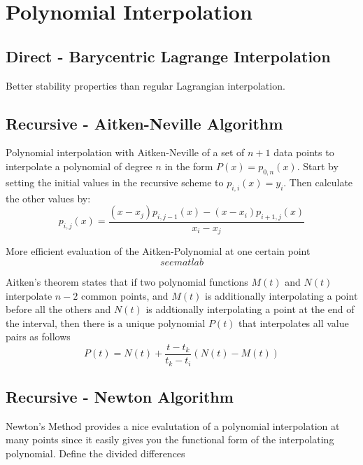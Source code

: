 \documentclass[
    a4paper,
    11pt
]{article}
\begin{document}
\section{Polynomial Interpolation}

\subsection{Direct - Barycentric Lagrange Interpolation}


Better stability properties than regular Lagrangian interpolation.

\subsection{Recursive - Aitken-Neville Algorithm}

Polynomial interpolation with Aitken-Neville of a set of $n+1$ data points to
interpolate a polynomial of degree $n$ in the form $P(x) = p_{0,n}(x)$. Start by
setting the initial values in the recursive scheme to $p_{i,i}(x)=y_i$. Then
calculate the other values by:
\begin{equation}
    p_{i,j}(x) = \frac{(x-x_j)p_{i,j-1}(x) - (x-x_i)p_{i+1,j}(x)}{x_i - x_j}
\end{equation}

More efficient evaluation of the Aitken-Polynomial at one certain point
\begin{equation}
    see matlab
\end{equation}

Aitken's theorem states that if two polynomial functions $M(t)$ and $N(t)$
interpolate $n-2$ common points, and $M(t)$ is additionally interpolating a
point before all the others and $N(t)$ is addtionally interpolating a point at
the end of the interval, then there is a unique polynomial $P(t)$ that
interpolates all value pairs as follows
\begin{equation}
    P(t) = N(t) + \frac{t - t_k}{t_k - t_i} (N(t) - M(t))
\end{equation}

\subsection{Recursive - Newton Algorithm}

Newton's Method provides a nice evalutation of a polynomial interpolation at
many points since it easily gives you the functional form of the interpolating
polynomial. Define the divided differences
\end{document}
